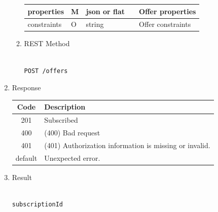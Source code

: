 \begin{enumerate}
\begin{enumerate}
\begin{table}[H]
\begin{center}
\begin{tabular}{|p{3cm}|l|p{3cm}|p{3cm}|p{4cm}|}
properties	& M	& 	json or flat	&		&	Offer properties \\ 

\hline

constraints	& O	& 	string	&		&	Offer constraints \\ 

\hline

\end{tabular}
\end{center}

\end{table}

\item REST Method

\begin{tcolorbox}[boxrule=0pt, frame empty]
\begin{verbatim} 

POST /offers

\end{verbatim}
\end{tcolorbox}

\end{enumerate}

\item Response

\begin{table}[H]
\footnotesize

\begin{center}
\begin{tabular}{|c|l|} 
\hline
\rowcolor{lightgray}	Code 		& 	Description \\
\hline
201	 		&	Subscribed \\
\hline
400			&	(400) Bad request \\
\hline
401			&	(401) Authorization information is missing or invalid. \\
\hline
default		&	Unexpected error. \\
\hline
\end{tabular}
\end{center}

\end{table}

\item Result

\begin{tcolorbox}[boxrule=0pt, frame empty]
\begin{verbatim}

subscriptionId

\end{verbatim}
\end{tcolorbox}


\end{enumerate}

